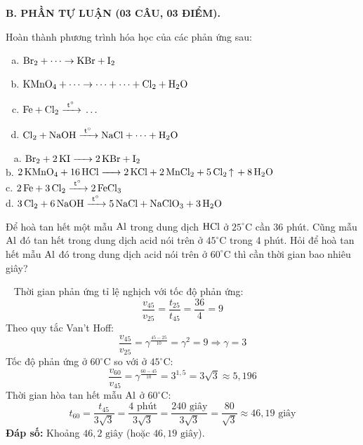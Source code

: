 \documentclass[12pt,a4paper]{article}
\renewcommand{\loigiai}[1]{%
  \par\smallskip\noindent{\color{blue!80!black}\textbf{Lời giải:}}\ #1\par\smallskip
}
\begin{document}

\vspace{0.3cm}
\noindent
\textbf{B. PHẦN TỰ LUẬN (03 CÂU, 03 ĐIỂM).}

\begin{ex}
Hoàn thành phương trình hóa học của các phản ứng sau:
\begin{enumerate}[a.]
	\item $\ce{Br2} + \dots \rightarrow \ce{KBr} + \ce{I2}$
	\item $\ce{KMnO4} + \dots \rightarrow \dots + \dots + \ce{Cl2} + \ce{H2O}$
	\item $\ce{Fe + Cl2 ->[t^\circ]} \dots$
	\item $\ce{Cl2 + NaOH ->[t^\circ] NaCl} + \dots + \ce{H2O}$
\end{enumerate}
\loigiai{
a. $\ce{Br2 + 2KI -> 2KBr + I2}$\\
b. $\ce{2KMnO4 + 16HCl -> 2KCl + 2MnCl2 + 5Cl2 ^ + 8H2O}$\\
c. $\ce{2Fe + 3Cl2 ->[t^\circ] 2FeCl3}$\\
d. $\ce{3Cl2 + 6NaOH ->[t^\circ] 5NaCl + NaClO3 + 3H2O}$
}
\end{ex}

\begin{ex}
Để hoà tan hết một mẫu $\ce{Al}$ trong dung dịch $\ce{HCl}$ ở $25^\circ\text{C}$ cần 36 phút. Cũng mẫu $\ce{Al}$ đó tan hết trong dung dịch acid nói trên ở $45^\circ\text{C}$ trong 4 phút. Hỏi để hoà tan hết mẫu $\ce{Al}$ đó trong dung dịch acid nói trên ở $60^\circ\text{C}$ thì cần thời gian bao nhiêu giây?
\loigiai{
Thời gian phản ứng tỉ lệ nghịch với tốc độ phản ứng:
\[\dfrac{v_{45}}{v_{25}} = \dfrac{t_{25}}{t_{45}} = \dfrac{36}{4} = 9\]
Theo quy tắc Van't Hoff:
\[\dfrac{v_{45}}{v_{25}} = \gamma^{\frac{45 - 25}{10}} = \gamma^2 = 9 \Rightarrow \gamma = 3\]
Tốc độ phản ứng ở $60^\circ\text{C}$ so với ở $45^\circ\text{C}$:
\[\dfrac{v_{60}}{v_{45}} = \gamma^{\frac{60 - 45}{10}} = 3^{1{,}5} = 3\sqrt{3} \approx 5{,}196\]
Thời gian hòa tan hết mẫu $\ce{Al}$ ở $60^\circ\text{C}$:
\[t_{60} = \dfrac{t_{45}}{3\sqrt{3}} = \dfrac{4\text{ phút}}{3\sqrt{3}} = \dfrac{240\text{ giây}}{3\sqrt{3}} = \dfrac{80}{\sqrt{3}} \approx 46{,}19\text{ giây}\]
\textbf{Đáp số:} Khoảng $46{,}2\text{ giây}$ (hoặc $46{,}19\text{ giây}$).
}
\end{ex}
\end{document}
